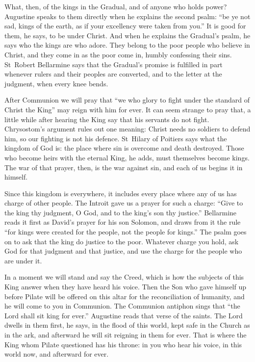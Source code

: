 \medskip

What, then, of the kings in the Gradual, and of anyone who holds power?
Augustine speaks to them directly when he explains the second psalm: ``be ye
not sad, kings of the earth, as if your excellency were taken from you.'' It
is good for them, he says, to be under Christ. And when he explains the
Gradual's psalm, he says who the kings are who adore. They belong to the poor
people who believe in Christ, and they come in as the poor come in, humbly
confessing their sins. St~Robert Bellarmine says that the Gradual's promise
is fulfilled in part whenever rulers and their peoples are converted, and to
the letter at the judgment, when every knee bends.

After Communion we will pray that ``we who glory to fight under the standard
of Christ the King'' may reign with him for ever. It can seem strange to pray
that, a little while after hearing the King say that his servants do not
fight. Chrysostom's argument rules out one meaning: Christ needs no soldiers
to defend him, so our fighting is not his defence. St~Hilary of Poitiers says
what the kingdom of God is: the place where sin is overcome and death
destroyed. Those who become heirs with the eternal King, he adds, must
themselves become kings. The war of that prayer, then, is the war against sin,
and each of us begins it in himself.

Since this kingdom is everywhere, it includes every place where any of us has
charge of other people. The Introit gave us a prayer for such a charge: ``Give
to the king thy judgment, O God, and to the king's son thy justice.''
Bellarmine reads it first as David's prayer for his son Solomon, and draws
from it the rule ``for kings were created for the people, not the people for
kings.''
The psalm goes on to ask that the king do justice to the poor. Whatever charge
you hold, ask God for that judgment and that justice, and use the charge for
the people who are under it.

\medskip

In a moment we will stand and say the Creed, which is how the subjects of this
King answer when they have heard his voice. Then the Son who gave himself up
before Pilate will be offered on this altar for the reconciliation of
humanity, and he will come to you in Communion. The Communion antiphon sings
that ``the Lord shall sit king for ever.'' Augustine reads that verse of the
saints. The Lord dwells in them first, he says, in the flood of this world,
kept safe in the Church as in the ark, and afterward he will sit reigning in
them for ever. That is where the King whom Pilate questioned has his throne:
in you who hear his voice, in this world now, and afterward for ever.
